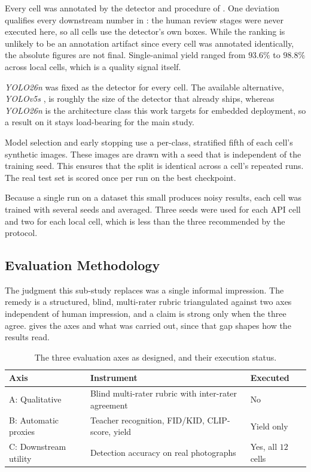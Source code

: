 Every cell was annotated by the detector \cite{beeryEfficientPipelineCamera2019} and procedure of . One deviation qualifies every downstream number in : the human review stages were never executed here, so all cells use the detector's own boxes. While the ranking is unlikely to be an annotation artifact since every cell was annotated identically, the absolute figures are not final. Single-animal yield ranged from $93.6\%$ to $98.8\%$ across local cells, which is a quality signal itself.

\textit{YOLO26n} \cite{UltralyticsYOLO262025} was fixed as the detector for every cell. The available alternative, \textit{YOLOv5s} \cite{ultralyticsComprehensiveGuideUltralytics}, is roughly the size of the detector that already ships, whereas \textit{YOLO26n} is the architecture class this work targets for embedded deployment, so a result on it stays load-bearing for the main study.

Model selection and early stopping use a per-class, stratified fifth of each cell's synthetic images. These images are drawn with a seed that is independent of the training seed. This ensures that the split is identical across a cell's repeated runs. The real test set is scored once per run on the best checkpoint.

Because a single run on a dataset this small produces noisy results, each cell was trained with several seeds and averaged. Three seeds were used for each API cell and two for each local cell, which is less than the three recommended by the protocol.

\subsection{Evaluation Methodology}\label{sec:generator_comparison_evaluation}

The judgment this sub-study replaces was a single informal impression. The remedy is a structured, blind, multi-rater rubric triangulated against two axes independent of human impression, and a claim is strong only when the three agree.  gives the axes and what was carried out, since that gap shapes how the results read.

\begin{table}[htbp]
\centering
\caption{The three evaluation axes as designed, and their execution status.}
\label{tab:generator-evaluation-axes}
\begin{tabularx}{\textwidth}{@{}lXl@{}}
\toprule
Axis & Instrument & Executed \\
\midrule
A: Qualitative & Blind multi-rater rubric with inter-rater agreement & No \\
B: Automatic proxies & Teacher recognition, FID/KID, CLIP-score, yield & Yield only \\
C: Downstream utility & Detection accuracy on real photographs & Yes, all $12$ cells \\
\bottomrule
\end{tabularx}
\end{table}

